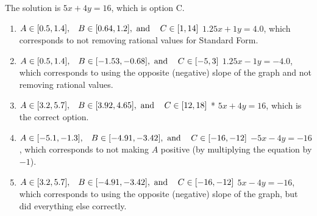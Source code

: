 \documentclass{extbook}[14pt]
\begin{document}
\begin{enumerate}
{The solution is \( 5x + 4y = 16 \), which is option C.\begin{enumerate}[label=\Alph*.]
\item \( A \in [0.5, 1.4], \hspace{3mm} B \in [0.64, 1.2], \text{ and } \hspace{3mm} C \in [1, 14] \)
 $1.25x + 1y = 4.0$, which corresponds to not removing rational values for Standard Form.
\item \( A \in [0.5, 1.4], \hspace{3mm} B \in [-1.53, -0.68], \text{ and } \hspace{3mm} C \in [-5, 3] \)
 $1.25x - 1y = -4.0$, which corresponds to using the opposite (negative) slope of the graph and not removing rational values.
\item \( A \in [3.2, 5.7], \hspace{3mm} B \in [3.92, 4.65], \text{ and } \hspace{3mm} C \in [12, 18] \)
* $5x + 4y = 16$, which is the correct option.
\item \( A \in [-5.1, -1.3], \hspace{3mm} B \in [-4.91, -3.42], \text{ and } \hspace{3mm} C \in [-16, -12] \)
 $-5x - 4y = -16$, which corresponds to not making $A$ positive (by multiplying the equation by $-1$).
\item \( A \in [3.2, 5.7], \hspace{3mm} B \in [-4.91, -3.42], \text{ and } \hspace{3mm} C \in [-16, -12] \)
 $5x - 4y = -16$, which corresponds to using the opposite (negative) slope of the graph, but did everything else correctly.
\end{enumerate}

}
\end{enumerate}
\end{document}

